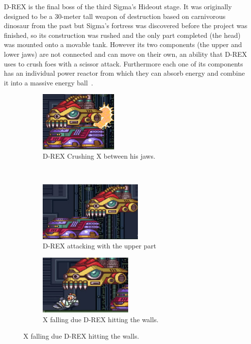 D-REX is the final boss of the third Sigma's Hideout stage. It was originally designed to be a 30-meter tall weapon of destruction based on carnivorous dinosaur from the past but Sigma's fortress was discovered before the project was finished, so its construction was rushed and the only part completed (the head) was mounted onto a movable tank. However its two components (the upper and lower jaws) are not connected and can move on their own, an ability that D-REX uses to crush foes with a scissor attack. Furthermore each one of its components has an individual power reactor from which they can absorb energy and combine it into a massive energy ball~\cite{wayback:X_resources}.
\begin{figure}[htp]
	\centering
	\begin{subfigure}[t]{0.40\linewidth}
		\centering
		\includegraphics[height=3cm]{figures/X1/Sigma_stages/Drex_crush.jpg}
		\caption{D-REX Crushing X between his jaws.}
	\end{subfigure}\\
	\begin{subfigure}[t]{0.49\linewidth}
		\centering
		\includegraphics[height=3cm]{figures/X1/Sigma_stages/Drex_press.jpg}
		\caption{D-REX attacking with the upper part}
	\end{subfigure}
	\begin{subfigure}[t]{0.49\linewidth}
		\centering
		\includegraphics[height=3cm]{figures/X1/Sigma_stages/Drex_trip.jpg}
		\caption{X falling due D-REX hitting the walls.}
	\end{subfigure}
\end{figure}
